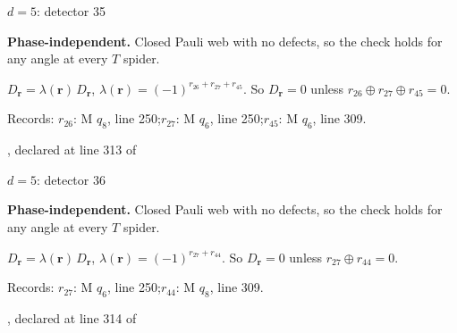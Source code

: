 \label{d5_det035}
{\Large $d=5$: detector 35}\par
\textbf{Phase-independent.} Closed Pauli web with no defects, so the check holds for any angle at every $T$ spider.
\begin{center}
\end{center}
\vspace{-1mm}
$D_{\boldsymbol r}=\lambda(\boldsymbol r)\,D_{\boldsymbol r}$, \quad $\lambda(\boldsymbol r)=(-1)^{r_{26}+r_{27}+r_{45}}$. \qquad So $D_{\boldsymbol r}=0$ unless $r_{26}\oplus r_{27}\oplus r_{45}=0$.
\par\smallskip\begin{minipage}{.98\linewidth}\small Records: $r_{26}$: M $q_{8}$, line 250;\quad $r_{27}$: M $q_{6}$, line 250;\quad $r_{45}$: M $q_{6}$, line 309.\end{minipage}
\vfill
{\footnotesize\texttt{}, declared at line 313 of \texttt{}}
\newpage

\label{d5_det036}
{\Large $d=5$: detector 36}\par
\textbf{Phase-independent.} Closed Pauli web with no defects, so the check holds for any angle at every $T$ spider.
\begin{center}
\end{center}
\vspace{-1mm}
$D_{\boldsymbol r}=\lambda(\boldsymbol r)\,D_{\boldsymbol r}$, \quad $\lambda(\boldsymbol r)=(-1)^{r_{27}+r_{44}}$. \qquad So $D_{\boldsymbol r}=0$ unless $r_{27}\oplus r_{44}=0$.
\par\smallskip\begin{minipage}{.98\linewidth}\small Records: $r_{27}$: M $q_{6}$, line 250;\quad $r_{44}$: M $q_{8}$, line 309.\end{minipage}
\vfill
{\footnotesize\texttt{}, declared at line 314 of \texttt{}}
\newpage

